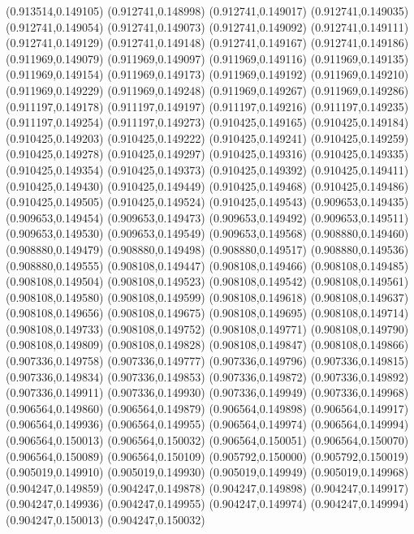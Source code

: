 (0.913514,0.149105)
(0.912741,0.148998)
(0.912741,0.149017)
(0.912741,0.149035)
(0.912741,0.149054)
(0.912741,0.149073)
(0.912741,0.149092)
(0.912741,0.149111)
(0.912741,0.149129)
(0.912741,0.149148)
(0.912741,0.149167)
(0.912741,0.149186)
(0.911969,0.149079)
(0.911969,0.149097)
(0.911969,0.149116)
(0.911969,0.149135)
(0.911969,0.149154)
(0.911969,0.149173)
(0.911969,0.149192)
(0.911969,0.149210)
(0.911969,0.149229)
(0.911969,0.149248)
(0.911969,0.149267)
(0.911969,0.149286)
(0.911197,0.149178)
(0.911197,0.149197)
(0.911197,0.149216)
(0.911197,0.149235)
(0.911197,0.149254)
(0.911197,0.149273)
(0.910425,0.149165)
(0.910425,0.149184)
(0.910425,0.149203)
(0.910425,0.149222)
(0.910425,0.149241)
(0.910425,0.149259)
(0.910425,0.149278)
(0.910425,0.149297)
(0.910425,0.149316)
(0.910425,0.149335)
(0.910425,0.149354)
(0.910425,0.149373)
(0.910425,0.149392)
(0.910425,0.149411)
(0.910425,0.149430)
(0.910425,0.149449)
(0.910425,0.149468)
(0.910425,0.149486)
(0.910425,0.149505)
(0.910425,0.149524)
(0.910425,0.149543)
(0.909653,0.149435)
(0.909653,0.149454)
(0.909653,0.149473)
(0.909653,0.149492)
(0.909653,0.149511)
(0.909653,0.149530)
(0.909653,0.149549)
(0.909653,0.149568)
(0.908880,0.149460)
(0.908880,0.149479)
(0.908880,0.149498)
(0.908880,0.149517)
(0.908880,0.149536)
(0.908880,0.149555)
(0.908108,0.149447)
(0.908108,0.149466)
(0.908108,0.149485)
(0.908108,0.149504)
(0.908108,0.149523)
(0.908108,0.149542)
(0.908108,0.149561)
(0.908108,0.149580)
(0.908108,0.149599)
(0.908108,0.149618)
(0.908108,0.149637)
(0.908108,0.149656)
(0.908108,0.149675)
(0.908108,0.149695)
(0.908108,0.149714)
(0.908108,0.149733)
(0.908108,0.149752)
(0.908108,0.149771)
(0.908108,0.149790)
(0.908108,0.149809)
(0.908108,0.149828)
(0.908108,0.149847)
(0.908108,0.149866)
(0.907336,0.149758)
(0.907336,0.149777)
(0.907336,0.149796)
(0.907336,0.149815)
(0.907336,0.149834)
(0.907336,0.149853)
(0.907336,0.149872)
(0.907336,0.149892)
(0.907336,0.149911)
(0.907336,0.149930)
(0.907336,0.149949)
(0.907336,0.149968)
(0.906564,0.149860)
(0.906564,0.149879)
(0.906564,0.149898)
(0.906564,0.149917)
(0.906564,0.149936)
(0.906564,0.149955)
(0.906564,0.149974)
(0.906564,0.149994)
(0.906564,0.150013)
(0.906564,0.150032)
(0.906564,0.150051)
(0.906564,0.150070)
(0.906564,0.150089)
(0.906564,0.150109)
(0.905792,0.150000)
(0.905792,0.150019)
(0.905019,0.149910)
(0.905019,0.149930)
(0.905019,0.149949)
(0.905019,0.149968)
(0.904247,0.149859)
(0.904247,0.149878)
(0.904247,0.149898)
(0.904247,0.149917)
(0.904247,0.149936)
(0.904247,0.149955)
(0.904247,0.149974)
(0.904247,0.149994)
(0.904247,0.150013)
(0.904247,0.150032)
